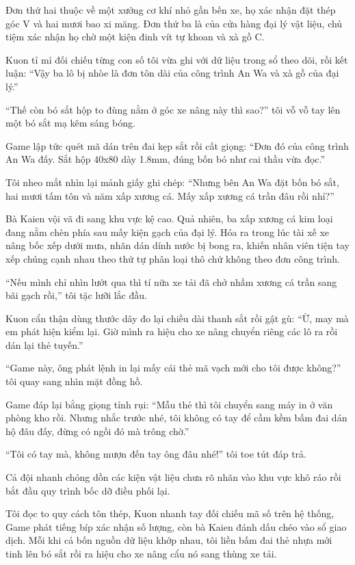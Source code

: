 ﻿\documentclass[../main.tex]{subfiles}
\begin{document}
Đơn thứ hai thuộc về một xưởng cơ khí nhỏ gần bến xe, họ xác nhận đặt thép góc V và hai mươi bao xi măng. Đơn thứ ba là của cửa hàng đại lý vật liệu, chủ tiệm xác nhận họ chờ một kiện đinh vít tự khoan và xà gồ C.

Kuon tỉ mỉ đối chiếu từng con số tôi vừa ghi với dữ liệu trong sổ theo dõi, rồi kết luận: ``Vậy ba lô bị nhòe là đơn tôn dài của công trình An Wa và xà gồ của đại lý.''

``Thế còn bó sắt hộp to đùng nằm ở góc xe nâng này thì sao?'' tôi vỗ vỗ tay lên một bó sắt mạ kẽm sáng bóng.

Game lập tức quét mã dán trên đai kẹp sắt rồi cất giọng: ``Đơn đó của công trình An Wa đấy. Sắt hộp 40x80 dày 1.8mm, đúng bốn bó như cai thầu vừa đọc.''

Tôi nheo mắt nhìn lại mảnh giấy ghi chép: ``Nhưng bên An Wa đặt bốn bó sắt, hai mươi tấm tôn và năm xấp xương cá. Mấy xấp xương cá trần đâu rồi nhỉ?''

Bà Kaien vội vã đi sang khu vực kệ cao. Quả nhiên, ba xấp xương cá kim loại đang nằm chèn phía sau mấy kiện gạch của đại lý. Hóa ra trong lúc tài xế xe nâng bốc xếp dưới mưa, nhãn dán dính nước bị bong ra, khiến nhân viên tiện tay xếp chúng cạnh nhau theo thứ tự phân loại thô chứ không theo đơn công trình.

``Nếu mình chỉ nhìn lướt qua thì tí nữa xe tải đã chở nhầm xương cá trần sang bãi gạch rồi,'' tôi tặc lưỡi lắc đầu.

Kuon cẩn thận dùng thước dây đo lại chiều dài thanh sắt rồi gật gù: ``Ừ, may mà em phát hiện kiểm lại. Giờ mình ra hiệu cho xe nâng chuyển riêng các lô ra rồi dán lại thẻ tuyến.''

``Game này, ông phát lệnh in lại mấy cái thẻ mã vạch mới cho tôi được không?'' tôi quay sang nhìn mặt đồng hồ.

Game đáp lại bằng giọng tỉnh rụi: ``Mẫu thẻ thì tôi chuyển sang máy in ở văn phòng kho rồi. Nhưng nhắc trước nhé, tôi không có tay để cầm kềm bấm đai dán hộ đâu đấy, đừng có ngồi đó mà trông chờ.''

``Tôi có tay mà, không mượn đến tay ông đâu nhé!'' tôi toe tút đáp trả.

\ct

Cả đội nhanh chóng dồn các kiện vật liệu chưa rõ nhãn vào khu vực khô ráo rồi bắt đầu quy trình bốc dỡ điều phối lại.

Tôi đọc to quy cách tôn thép, Kuon nhanh tay đối chiếu mã số trên hệ thống, Game phát tiếng bíp xác nhận số lượng, còn bà Kaien đánh dấu chéo vào sổ giao dịch. Mỗi khi cả bốn nguồn dữ liệu khớp nhau, tôi liền bấm đai thẻ nhựa mới tinh lên bó sắt rồi ra hiệu cho xe nâng cẩu nó sang thùng xe tải.
\end{document}
